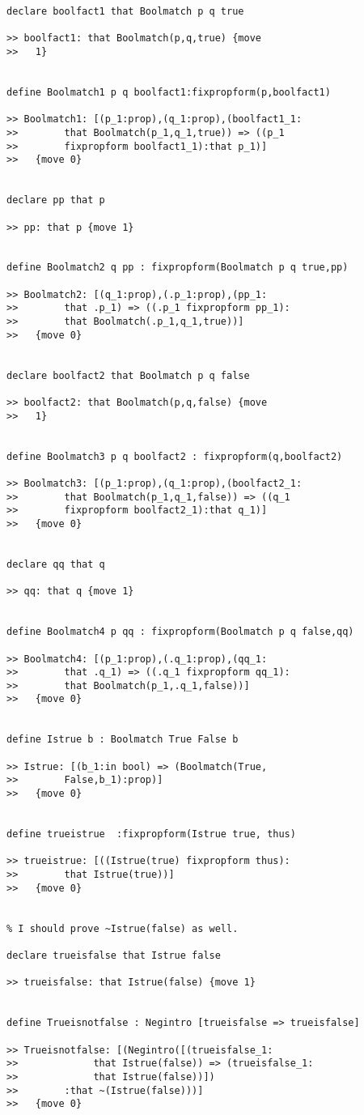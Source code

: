 \documentclass[12pt]{article}
\begin{document}
\begin{verbatim}
declare boolfact1 that Boolmatch p q true

>> boolfact1: that Boolmatch(p,q,true) {move 
>>   1}


define Boolmatch1 p q boolfact1:fixpropform(p,boolfact1)

>> Boolmatch1: [(p_1:prop),(q_1:prop),(boolfact1_1:
>>        that Boolmatch(p_1,q_1,true)) => ((p_1 
>>        fixpropform boolfact1_1):that p_1)]
>>   {move 0}


declare pp that p

>> pp: that p {move 1}


define Boolmatch2 q pp : fixpropform(Boolmatch p q true,pp)

>> Boolmatch2: [(q_1:prop),(.p_1:prop),(pp_1:
>>        that .p_1) => ((.p_1 fixpropform pp_1):
>>        that Boolmatch(.p_1,q_1,true))]
>>   {move 0}


declare boolfact2 that Boolmatch p q false

>> boolfact2: that Boolmatch(p,q,false) {move 
>>   1}


define Boolmatch3 p q boolfact2 : fixpropform(q,boolfact2)

>> Boolmatch3: [(p_1:prop),(q_1:prop),(boolfact2_1:
>>        that Boolmatch(p_1,q_1,false)) => ((q_1 
>>        fixpropform boolfact2_1):that q_1)]
>>   {move 0}


declare qq that q

>> qq: that q {move 1}


define Boolmatch4 p qq : fixpropform(Boolmatch p q false,qq)

>> Boolmatch4: [(p_1:prop),(.q_1:prop),(qq_1:
>>        that .q_1) => ((.q_1 fixpropform qq_1):
>>        that Boolmatch(p_1,.q_1,false))]
>>   {move 0}


define Istrue b : Boolmatch True False b

>> Istrue: [(b_1:in bool) => (Boolmatch(True,
>>        False,b_1):prop)]
>>   {move 0}


define trueistrue  :fixpropform(Istrue true, thus)

>> trueistrue: [((Istrue(true) fixpropform thus):
>>        that Istrue(true))]
>>   {move 0}


% I should prove ~Istrue(false) as well.

declare trueisfalse that Istrue false

>> trueisfalse: that Istrue(false) {move 1}


define Trueisnotfalse : Negintro [trueisfalse => trueisfalse]

>> Trueisnotfalse: [(Negintro([(trueisfalse_1:
>>             that Istrue(false)) => (trueisfalse_1:
>>             that Istrue(false))])
>>        :that ~(Istrue(false)))]
>>   {move 0}



\end{verbatim}
\end{document}
